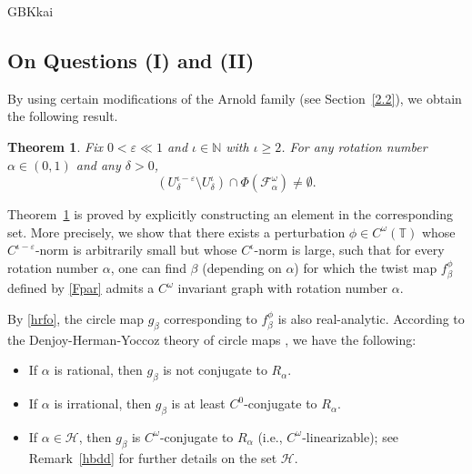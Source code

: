 \documentclass{amsart}
\newtheorem{Theorem}{Theorem}
\theoremstyle{definition}
\begin{document}
\begin{CJK*}{GBK}{kai}
		
			\vspace{1ex}
		\subsection{On Questions (I) and (II)}
		By using certain modifications of  the Arnold family (see Section~\ref{2.2}), we obtain the following result.

\begin{Theorem}\label{M0}
Fix \( 0 < \varepsilon \ll 1 \) and $\iota \in \mathbb{N}$ with $\iota \geq 2$. For any rotation number \( \alpha \in (0,1) \) and any \( \delta > 0 \),
\[
\left(U_\delta^{\iota - \varepsilon} \setminus U_\delta^\iota\right) \cap \Phi(\mathcal{F}_\alpha^\omega) \neq \emptyset.
\]
\end{Theorem}

\vspace{1ex}

 Theorem~\ref{M0} is proved by explicitly constructing an element in the corresponding set. More precisely, we show that there exists a perturbation \(\phi \in C^\omega(\mathbb{T})\) whose \(C^{\iota-\varepsilon}\)-norm is arbitrarily small but whose \(C^\iota\)-norm is large, such that for every rotation number \(\alpha\), one can find \(\beta\) (depending on \(\alpha\)) for which the twist map \(f_\beta^\phi\) defined by \eqref{Fpar} admits a $C^\omega$ invariant graph with rotation number $\alpha$.



	\vspace{1ex}

By \eqref{hrfo}, the circle map \(g_\beta\) corresponding to \(f_\beta^\phi\) is also real-analytic. According to the Denjoy-Herman-Yoccoz theory of circle maps \cite{De,H11,Y1,Y2,Y3}, we have the following:
\begin{itemize}
 \item If \(\alpha\) is rational, then \(g_\beta\) is not conjugate to \(R_\alpha\).
    \item If \(\alpha\) is irrational, then \(g_\beta\) is at least \(C^0\)-conjugate to \(R_\alpha\).
    \item If \(\alpha \in \mathcal{H}\), then \(g_\beta\) is \(C^\omega\)-conjugate to \(R_\alpha\) (i.e., \(C^\omega\)-linearizable); see Remark~\ref{hbdd} for further details on the set \(\mathcal{H}\).
\end{itemize}


\end{CJK*}
\end{document}
